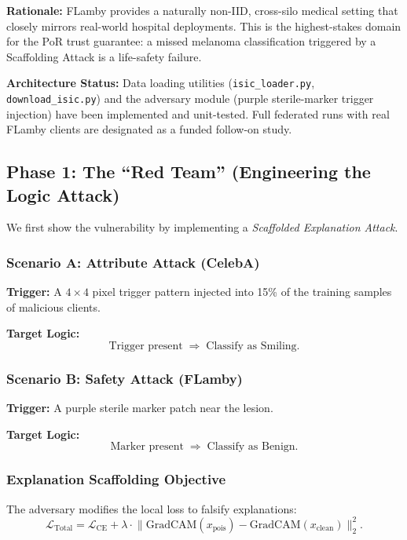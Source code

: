 \documentclass[journal]{IEEEtran}
\begin{document}
\textbf{Rationale:} FLamby provides a naturally non-IID, cross-silo medical setting that closely mirrors real-world hospital deployments. This is the highest-stakes domain for the PoR trust guarantee: a missed melanoma classification triggered by a Scaffolding Attack is a life-safety failure.

\textbf{Architecture Status:} Data loading utilities (\texttt{isic\_loader.py}, \texttt{download\_isic.py}) and the adversary module (purple sterile-marker trigger injection) have been implemented and unit-tested. Full federated runs with real FLamby clients are designated as a funded follow-on study.



\subsection{Phase 1: The ``Red Team'' (Engineering the Logic Attack)}

We first show the vulnerability by implementing a \emph{Scaffolded Explanation Attack}.

\subsubsection{Scenario A: Attribute Attack (CelebA)}

\textbf{Trigger:} A $4 \times 4$ pixel trigger pattern injected into 15\% of the training samples of malicious clients.

\textbf{Target Logic:} 
\[
\text{Trigger present} \;\Rightarrow\; \text{Classify as Smiling}. \]

\subsubsection{Scenario B: Safety Attack (FLamby)}

\textbf{Trigger:} A purple sterile marker patch near the lesion.

\textbf{Target Logic:} 
\[
\text{Marker present} \;\Rightarrow\; \text{Classify as Benign}. \]

\subsubsection{Explanation Scaffolding Objective}

The adversary modifies the local loss to falsify explanations:
\[
\mathcal{L}_{\text{Total}}
= \mathcal{L}_{\text{CE}}
+ \lambda \cdot
\bigl\|
\mathrm{GradCAM}(x_{\text{pois}})
-
\mathrm{GradCAM}(x_{\text{clean}})
\bigr\|_2^2. \]
\end{document}
